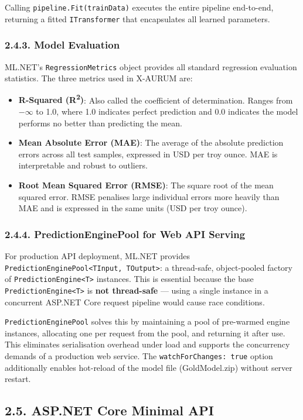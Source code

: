 Calling \texttt{pipeline.Fit(trainData)} executes the entire pipeline end-to-end, returning a fitted \texttt{ITransformer} that encapsulates all learned parameters.

\subsubsection{2.4.3. Model Evaluation}
ML.NET's \texttt{RegressionMetrics} object provides all standard regression evaluation statistics. The three metrics used in X-AURUM are:

\begin{itemize}
  \item \textbf{R-Squared (R\textsuperscript{2})}: Also called the coefficient of determination. Ranges from $-\infty$ to 1.0, where 1.0 indicates perfect prediction and 0.0 indicates the model performs no better than predicting the mean.
  \item \textbf{Mean Absolute Error (MAE)}: The average of the absolute prediction errors across all test samples, expressed in USD per troy ounce. MAE is interpretable and robust to outliers.
  \item \textbf{Root Mean Squared Error (RMSE)}: The square root of the mean squared error. RMSE penalises large individual errors more heavily than MAE and is expressed in the same units (USD per troy ounce).
\end{itemize}

\subsubsection{2.4.4. PredictionEnginePool for Web API Serving}
For production API deployment, ML.NET provides \texttt{PredictionEnginePool<TInput, TOutput>}: a thread-safe, object-pooled factory of \texttt{PredictionEngine<T>} instances. This is essential because the base \texttt{PredictionEngine<T>} is \textbf{not thread-safe} --- using a single instance in a concurrent ASP.NET Core request pipeline would cause race conditions.

\texttt{PredictionEnginePool} solves this by maintaining a pool of pre-warmed engine instances, allocating one per request from the pool, and returning it after use. This eliminates serialisation overhead under load and supports the concurrency demands of a production web service. The \texttt{watchForChanges: true} option additionally enables hot-reload of the model file (GoldModel.zip) without server restart.

\subsection{2.5. ASP.NET Core Minimal API}

